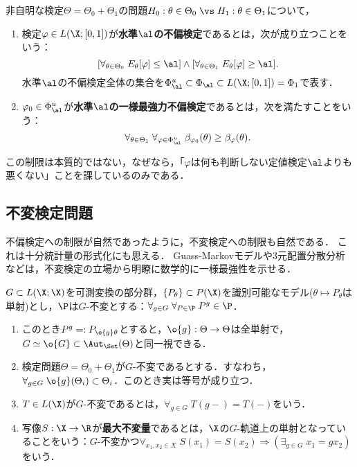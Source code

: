 \documentclass[uplatex,dvipdfmx]{jsreport}
\begin{document}
\begin{definition}
    非自明な検定$\Theta=\Theta_0+\Theta_1$の問題$H_0:\theta\in\Theta_0\;\vs\;H_1:\theta\in\Theta_1$について，
    \begin{enumerate}
        \item 検定$\varphi\in L(\X;[0,1])$が\textbf{水準$\al$の不偏検定}であるとは，次が成り立つことをいう：
        \[[\forall_{\theta\in\Theta_0}\;E_\theta[\varphi]\le\al]\land[\forall_{\theta\in\Theta_1}\;E_\theta[\varphi]\ge\al].\]
        水準$\al$の不偏検定全体の集合を$\Phi_\al^u\subset\Phi_\al\subset L(\X;[0,1])=\Phi_1$で表す．
        \item $\varphi_0\in\Phi^u_\al$が\textbf{水準$\al$の一様最強力不偏検定}であるとは，次を満たすことをいう：
        \[\forall_{\theta\in\Theta_1}\;\forall_{\varphi\in\Phi^u_\al}\;\beta_{\varphi_0}(\theta)\ge\beta_\varphi(\theta).\]
    \end{enumerate}
\end{definition}
\begin{remarks}
    この制限は本質的ではない，なぜなら，「$\varphi$は何も判断しない定値検定$\al$よりも悪くない」ことを課しているのみである．
\end{remarks}



\subsection{不変検定問題}

\begin{tcolorbox}[colframe=ForestGreen, colback=ForestGreen!10!white,breakable,colbacktitle=ForestGreen!40!white,coltitle=black,fonttitle=\bfseries\sffamily,
title=]
    不偏検定への制限が自然であったように，不変検定への制限も自然である．
    これは十分統計量の形式化にも思える．
    Guass-Markovモデルや3元配置分散分析などは，不変検定の立場から明瞭に数学的に一様最強性を示せる．
\end{tcolorbox}

\begin{model}
    $G\subset L(\X;\X)$を可測変換の部分群，$\{P_\theta\}\subset P(\X)$を識別可能なモデル($\theta\mapsto P_\theta$は単射)とし，$\P$は$G$-不変とする：$\forall_{g\in G}\;\forall_{P\in\P}\;P^g\in\P$．
    \begin{enumerate}
        \item このとき$P^g=:P_{\o{g}\theta}$とすると，$\o{g}:\Theta\to\Theta$は全単射で，$G\simeq\o{G}\subset\Aut_\Set(\Theta)$と同一視できる．
        \item 検定問題$\Theta=\Theta_0+\Theta_1$が$G$-不変であるとする．すなわち，$\forall_{g\in G}\;\o{g}(\Theta_i)\subset\Theta_i$．このとき実は等号が成り立つ．
        \item $T\in L(\X)$が$G$-不変であるとは，$\forall_{g\in G}\;T(g-)=T(-)$をいう．
        \item 写像$S:\X\to\R$が\textbf{最大不変量}であるとは，$\X$の$G$-軌道上の単射となっていることをいう：$G$-不変かつ$\forall_{x_1,x_2\in X}\;S(x_1)=S(x_2)\Rightarrow(\exists_{g\in G}\;x_1=gx_2)$をいう．
    \end{enumerate}
\end{model}
\end{document}
